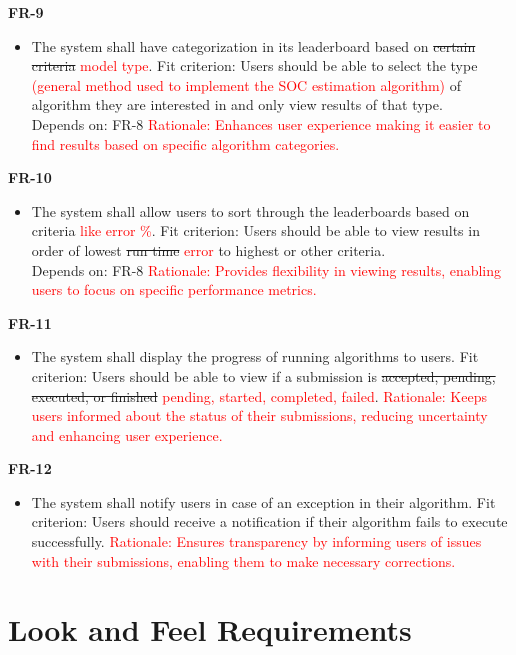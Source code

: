 \documentclass[12pt]{article}
\begin{document}
\textbf{FR-9}
\begin{itemize}
    \item The system shall have categorization in its leaderboard based on \sout{certain criteria} \textcolor{red}{model type}. \hfill \break
    Fit criterion: Users should be able to select the type \textcolor{red}{(general method used to implement the SOC estimation algorithm)} of algorithm they are interested in and only view results of that type. \\
    Depends on: FR-8
    \hfill \break
    \textcolor{red} {Rationale: Enhances user experience making it easier to find results based on specific algorithm categories.}
\end{itemize}
\textbf{FR-10}
\begin{itemize}
    \item The system shall allow users to sort through the leaderboards based on criteria \textcolor{red}{like error \%}. \hfill \break
    Fit criterion: Users should be able to view results in order of lowest \sout{run time} \textcolor{red}{error} to highest or other criteria. \\
    Depends on: FR-8
    \hfill \break
    \textcolor{red} {Rationale: Provides flexibility in viewing results, enabling users to focus on specific performance metrics.}
\end{itemize}
\textbf{FR-11}
\begin{itemize}
    \item The system shall display the progress of running algorithms to users. \hfill \break
    Fit criterion: Users should be able to view if a submission is \sout{accepted, pending, executed, or finished} \textcolor{red}{pending, started, completed, failed}.
    \hfill \break
    \textcolor{red} {Rationale: Keeps users informed about the status of their submissions, reducing uncertainty and enhancing user experience.}
\end{itemize}
\textbf{FR-12}
\begin{itemize}
    \item The system shall notify users in case of an exception in their algorithm. \hfill \break
    Fit criterion: Users should receive a notification if their algorithm fails to execute successfully.
    \hfill \break
    \textcolor{red} {Rationale: Ensures transparency by informing users of issues with their submissions, enabling them to make necessary corrections.}
\end{itemize}

\section{Look and Feel Requirements}
\end{document}
